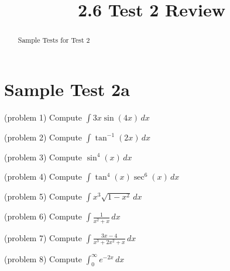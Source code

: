 \documentclass{ximera}
\title{2.6 Test 2 Review}
\begin{document}
\begin{abstract}
Sample Tests for Test 2
\end{abstract}

\maketitle

\section{Sample Test 2a}





\begin{problem}(problem 1)
Compute $\displaystyle \int 3x\sin(4x) \, dx$

\end{problem}


\begin{problem}(problem 2)
Compute $\displaystyle \int \tan^{-1}(2x) \, dx$

\end{problem}

\begin{problem}(problem 3)
Compute $\displaystyle \sin^4(x) \, dx$

\end{problem}

\begin{problem}(problem 4)
Compute $\displaystyle \int \tan^4(x) \sec^6(x) \, dx$

\end{problem}

\begin{problem}(problem 5)
Compute $\displaystyle \int x^3 \sqrt{1-x^2} \, dx$

\end{problem}

\begin{problem}(problem 6)
Compute $\displaystyle \int \frac{1}{x^2 + x} \, dx$

\end{problem}

\begin{problem}(problem 7)
Compute $\displaystyle \int \frac{3x-4}{x^3 +2x^2 +x} \, dx$

\end{problem}

\begin{problem}(problem 8)
Compute $\displaystyle \int_0^\infty e^{-2x} \, dx$

\end{problem}
\end{document}
